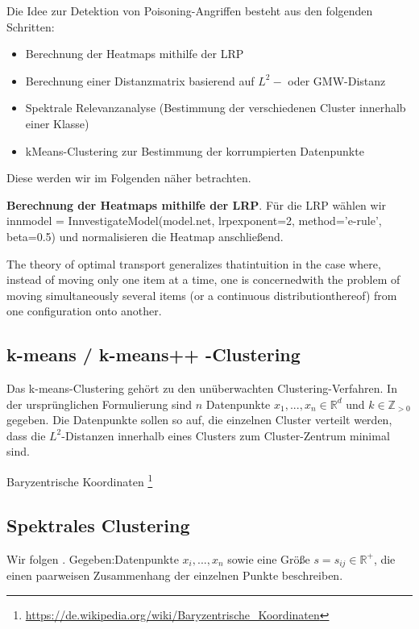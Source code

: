 \documentclass[11pt,a4paper]{article}
\numberwithin{equation}{section}
\begin{document}
	Die Idee zur Detektion von Poisoning-Angriffen besteht aus den folgenden Schritten:
	
	\begin{itemize}
		\item Berechnung der Heatmaps mithilfe der LRP
		\item Berechnung einer Distanzmatrix basierend auf $L^2-$ oder GMW-Distanz
		\item Spektrale Relevanzanalyse (Bestimmung der verschiedenen Cluster innerhalb einer Klasse)
		\item kMeans-Clustering zur Bestimmung der korrumpierten Datenpunkte
	\end{itemize}
	
	Diese werden wir im Folgenden näher betrachten.
	
	\noindent\textbf{Berechnung der Heatmaps mithilfe der LRP}.	Für die LRP wählen wir innmodel = InnvestigateModel(model.net, lrpexponent=2,
	method='e-rule', beta=0.5) und normalisieren die Heatmap anschließend.
	
	
	
	The theory of optimal transport generalizes thatintuition in the case where, instead of moving only one item at a time, one is concernedwith the problem of moving simultaneously several items (or a continuous distributionthereof) from one configuration onto another.\cite{computationalOT}
	\subsection{k-means / k-means++ -Clustering}
	Das k-means-Clustering gehört zu den unüberwachten Clustering-Verfahren. In der ursprünglichen Formulierung sind $n$ Datenpunkte $x_1,...,x_n \in \mathbb{R}^d$ und $k \in \mathbb{Z}_{>0}$ gegeben. Die Datenpunkte sollen so auf, die einzelnen Cluster verteilt werden, dass die $L^2$-Distanzen innerhalb eines Clusters zum Cluster-Zentrum minimal sind. 
	
	
	
	
	
	Baryzentrische Koordinaten \footnote{\url{https://de.wikipedia.org/wiki/Baryzentrische_Koordinaten}}
	
	\subsection{Spektrales Clustering}
	Wir folgen \cite{spectralClustering_tut}.
	Gegeben:Datenpunkte $x_i, ..., x_n$ sowie eine Größe $s = s_{ij} \in \mathbb{R}^{+}$, die einen paarweisen Zusammenhang der einzelnen Punkte beschreiben.
	
\end{document}
